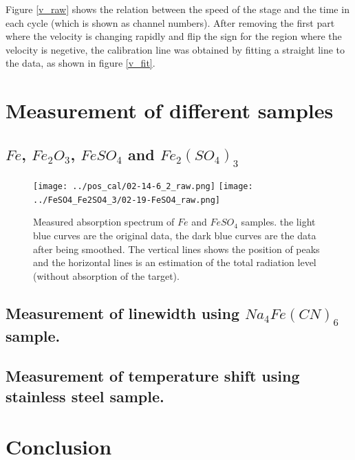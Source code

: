 \documentclass[aps,twocolumn,secnumarabic,balancelastpage,amsmath,amssymb,nofootinbib]{revtex4}
\begin{document}
Figure \ref{v_raw} shows the relation between the speed of the stage and the time in each cycle (which is shown as channel numbers). After removing the first part where the velocity is changing rapidly and flip the sign for the region where the velocity is negetive, the calibration line was obtained by fitting a straight line to the data, as shown in figure \ref{v_fit}.

\section{Measurement of different samples}
\subsection{$Fe$, $Fe_2O_3$, $FeSO_4$ and $Fe_2(SO_4)_3$}
\begin{figure}
  \texttt{[image: ../pos\_cal/02-14-6\_2\_raw.png]}
  \texttt{[image: ../FeSO4\_Fe2SO4\_3/02-19-FeSO4\_raw.png]}
  \caption{Measured absorption spectrum of $Fe$ and $FeSO_4$ samples. the light blue curves are the original data, the dark blue curves are the data after being smoothed. The vertical lines shows the position of peaks and the horizontal lines is an estimation of the total radiation level (without absorption of the target).}
  \label{samples_raw}
\end{figure}

\subsection{Measurement of linewidth using $Na_4Fe(CN)_6$ sample.}

\subsection{Measurement of temperature shift using stainless steel sample.}

\section{Conclusion}


\end{document}
